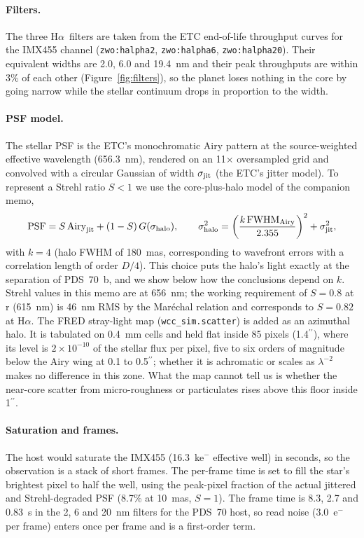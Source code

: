 \documentclass[11pt]{article}
\newcommand{\Ha}{H$\alpha$}
\begin{document}
\paragraph{Filters.} The three \Ha\ filters are taken from the ETC end-of-life throughput curves for the IMX455 channel (\texttt{zwo:halpha2}, \texttt{zwo:halpha6}, \texttt{zwo:halpha20}). Their equivalent widths are 2.0, 6.0 and 19.4~nm and their peak throughputs are within 3\% of each other (Figure~\ref{fig:filters}), so the planet loses nothing in the core by going narrow while the stellar continuum drops in proportion to the width.

\paragraph{PSF model.} The stellar PSF is the ETC's monochromatic Airy pattern at the source-weighted effective wavelength (656.3~nm), rendered on an 11$\times$ oversampled grid and convolved with a circular Gaussian of width $\sigma_{\rm jit}$ (the ETC's jitter model). To represent a Strehl ratio $S < 1$ we use the core-plus-halo model of the companion memo,
\begin{equation}
  \mathrm{PSF} = S\,\mathrm{Airy}_{\rm jit} + (1 - S)\,G(\sigma_{\rm halo}),\qquad
  \sigma_{\rm halo}^2 = \left(\frac{k\,\mathrm{FWHM}_{\rm Airy}}{2.355}\right)^2 + \sigma_{\rm jit}^2,
  \label{eq:psf}
\end{equation}
with $k = 4$ (halo FWHM of 180~mas, corresponding to wavefront errors with a correlation length of order $D/4$). This choice puts the halo's light exactly at the separation of PDS~70~b, and we show below how the conclusions depend on $k$. Strehl values in this memo are at 656~nm; the working requirement of $S = 0.8$ at r (615~nm) is 46~nm RMS by the Mar\'echal relation and corresponds to $S = 0.82$ at \Ha. The FRED stray-light map (\texttt{wcc\_sim.scatter}) is added as an azimuthal halo. It is tabulated on 0.4~mm cells and held flat inside 85 pixels (1.4$^{\prime\prime}$), where its level is $2 \times 10^{-10}$ of the stellar flux per pixel, five to six orders of magnitude below the Airy wing at 0.1 to 0.5$^{\prime\prime}$; whether it is achromatic or scales as $\lambda^{-2}$ makes no difference in this zone. What the map cannot tell us is whether the near-core scatter from micro-roughness or particulates rises above this floor inside 1$^{\prime\prime}$.

\paragraph{Saturation and frames.} The host would saturate the IMX455 (16.3~ke$^-$ effective well) in seconds, so the observation is a stack of short frames. The per-frame time is set to fill the star's brightest pixel to half the well, using the peak-pixel fraction of the actual jittered and Strehl-degraded PSF (8.7\% at 10~mas, $S = 1$). The frame time is 8.3, 2.7 and 0.83~s in the 2, 6 and 20~nm filters for the PDS~70 host, so read noise (3.0~e$^-$ per frame) enters once per frame and is a first-order term.
\end{document}
